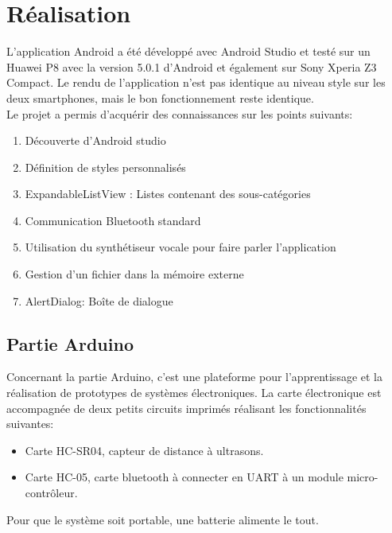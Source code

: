 \section{Réalisation}
L'application Android a été développé avec Android Studio et testé sur un Huawei P8 avec la version 5.0.1 d'Android et également sur Sony Xperia Z3 Compact. Le rendu de l'application n'est pas identique au niveau style sur les deux smartphones, mais le bon fonctionnement reste identique.\\
Le projet a permis d'acquérir des connaissances sur les points suivants:
\begin{enumerate}
	\item Découverte d'Android studio
	\item Définition de styles personnalisés
	\item ExpandableListView : Listes contenant des sous-catégories
	\item Communication Bluetooth standard
	\item Utilisation du synthétiseur vocale pour faire parler l'application
	\item Gestion d'un fichier dans la mémoire externe
	\item AlertDialog: Boîte de dialogue\\
\end{enumerate}

\subsection{Partie Arduino}
Concernant la partie Arduino, c'est une plateforme pour l'apprentissage et la réalisation de prototypes de systèmes électroniques. La carte électronique est accompagnée de deux petits circuits imprimés réalisant les fonctionnalités suivantes:
\begin{itemize}
	\item Carte HC-SR04, capteur de distance à ultrasons.
	\item Carte HC-05, carte bluetooth à connecter en UART à un module micro-contrôleur.
\end{itemize}
Pour que le système soit portable, une batterie alimente le tout.